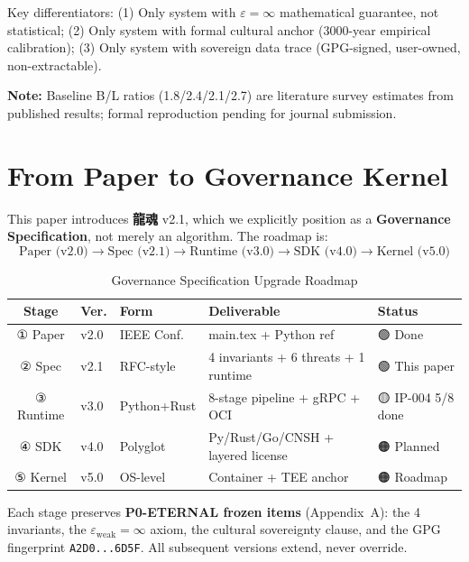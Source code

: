 \documentclass[conference]{IEEEtran}
\newcommand{\LH}{\textcolor{dragonRed}{\textbf{龍魂}}}
\begin{document}
Key differentiators:
(1) Only system with $\varepsilon = \infty$
mathematical guarantee, not statistical;
(2) Only system with formal cultural anchor
(3000-year empirical calibration);
(3) Only system with sovereign data trace
(GPG-signed, user-owned, non-extractable).

\noindent\textbf{Note:} Baseline B/L ratios (1.8/2.4/2.1/2.7) are
literature survey estimates from published results;
formal reproduction pending for journal submission.

\section{From Paper to Governance Kernel}
\label{sec:governance}

This paper introduces \LH{} v2.1, which we explicitly
position as a \textbf{Governance Specification}, not
merely an algorithm. The roadmap is:
\[
\text{Paper (v2.0)} \to \text{Spec (v2.1)} \to
\text{Runtime (v3.0)} \to \text{SDK (v4.0)} \to
\text{Kernel (v5.0)}
\]

\begin{table}[h]
\centering
\caption{Governance Specification Upgrade Roadmap}
\label{tab:roadmap}
\begin{tabular}{cllp{2.5cm}l}
\toprule
\textbf{Stage} & \textbf{Ver.} & \textbf{Form} & \textbf{Deliverable} & \textbf{Status} \\
\midrule
① Paper    & v2.0 & IEEE Conf.   & main.tex + Python ref & 🟢 Done \\
② Spec     & v2.1 & RFC-style    & 4 invariants + 6 threats + 1 runtime & 🟢 This paper \\
③ Runtime  & v3.0 & Python+Rust  & 8-stage pipeline + gRPC + OCI & 🟡 IP-004 5/8 done \\
④ SDK      & v4.0 & Polyglot     & Py/Rust/Go/CNSH + layered license & 🟠 Planned \\
⑤ Kernel   & v5.0 & OS-level     & Container + TEE anchor & 🟠 Roadmap \\
\bottomrule
\end{tabular}
\end{table}

Each stage preserves \textbf{P0-ETERNAL frozen items}
(Appendix~A): the 4 invariants, the $\varepsilon_{\text{weak}}
= \infty$ axiom, the cultural sovereignty clause, and the
GPG fingerprint \texttt{A2D0...6D5F}.
All subsequent versions extend, never override.
\end{document}
